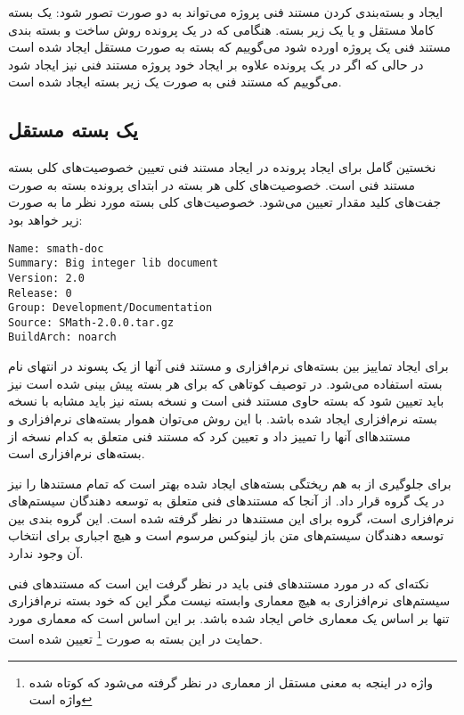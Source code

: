 ایجاد و بسته‌بندی کردن مستند فنی پروژه می‌تواند به دو صورت تصور شود: یک بسته
کاملا مستقل و یا یک زیر بسته. هنگامی که در یک پرونده  روش ساخت و بسته
بندی مستند فنی یک پروژه اورده شود می‌گوییم که بسته به صورت مستقل ایجاد شده است
در حالی که اگر در یک پرونده  علاوه بر ایجاد خود پروژه مستند فنی نیز
ایجاد شود می‌گوییم که مستند فنی به صورت یک زیر بسته ایجاد شده است.

\subsection{یک بسته مستقل}

نخستین گامل برای ایجاد پرونده  در ایجاد مستند فنی تعیین خصوصیت‌های کلی
بسته مستند فنی است. خصوصیت‌های کلی هر بسته در ابتدای پرونده بسته به صورت جفت‌های
کلید مقدار تعیین می‌شود.  خصوصیت‌های کلی بسته مورد نظر ما به صورت زیر خواهد بود:

\begin{latin}
\lstset{language=TeX}  
\begin{lstlisting}[frame=single] 
Name: smath-doc
Summary: Big integer lib document
Version: 2.0
Release: 0
Group: Development/Documentation
Source: SMath-2.0.0.tar.gz
BuildArch: noarch
\end{lstlisting}
\end{latin}

برای ایجاد تماییز بین بسته‌های نرم‌افزاری و مستند فنی آنها از یک پسوند 
در انتهای نام بسته استفاده می‌شود. در توصیف کوتاهی که برای هر بسته پیش بینی شده
است نیز باید تعیین شود که بسته حاوی مستند فنی است و نسخه بسته نیز باید مشابه با
نسخه بسته نرم‌افزاری ایجاد شده باشد. با این روش می‌توان هموار بسته‌های
نرم‌افزاری و مستندهاای آنها را تمییز داد و تعیین کرد که مستند فنی متعلق به کدام
نسخه از بسته‌های نرم‌افزاری است.

برای جلوگیری از به هم ریختگی بسته‌های ایجاد شده بهتر است که تمام مستندها را نیز
در یک گروه قرار داد. از آنجا که مستند‌های فنی متعلق به توسعه دهندگان سیستم‌های
نرم‌افزاری است، گروه  برای این مستندها در نظر
گرفته شده است. این گروه بندی بین توسعه دهندگان سیستم‌های متن باز لینوکس مرسوم
است و هیچ اجباری برای انتخاب آن وجود ندارد.

نکته‌ای که در مورد مستندهای فنی باید در نظر گرفت این است که مستندهای فنی
سیستم‌های نرم‌افزاری به هیچ معماری وابسته نیست مگر این که خود بسته نرم‌افزاری
تنها بر اساس یک معماری خاص ایجاد شده باشد. بر این اساس است که معماری مورد حمایت
در این بسته به صورت 
\footnote{واژه  در اینجه به معنی مستقل از معماری در نظر
گرفته می‌شود که کوتاه شده واژه  است}
تعیین شده است.
 

